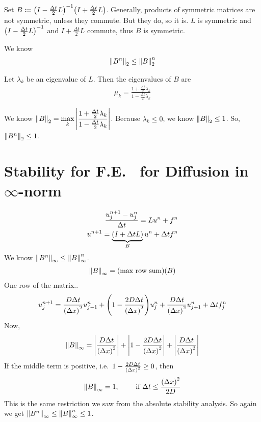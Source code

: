 \documentclass{article}
\newcommand{\Dx}{\Delta x}
\newcommand{\Dt}{\Delta t}
\newcommand{\centdiff}{\frac{u_j^{n+1} - u_j^n}{\Dt}}
\begin{document}
        Set $B \coloneqq \qty(I - \frac{\Dt}{2}L)^{-1}\qty(I + \frac{\Dt}{2}L)$.  Generally, products of symmetric matrices are not symmetric, unless they commute.  But they do, so it is.  $L$ is symmetric and $\qty(I - \frac{\Dt}{2}L)^{-1}$ and $I + \frac{\Dt}{2}L$ commute, thus $B$ is symmetric.

        We know
        \begin{align*}
            \norm{B^n}_2 \leq \norm{B}_2^n
        \end{align*}

        Let $\lambda_k$ be an eigenvalue of $L$.  Then the eigenvalues of $B$ are
        \begin{align*}
            \mu_k = \frac{1 + \frac{\Dt}{2}\lambda_k}{1 - \frac{\Dt}{2}\lambda_k}
        \end{align*}

        We know $\displaystyle\norm{B}_2 = \max_k\abs{\frac{1 + \frac{\Dt}{2}\lambda_k}{1 - \frac{\Dt}{2}\lambda_k}}$.  Because $\lambda_k \leq 0$, we know $\norm{B}_2 \leq 1$.  So, $\norm{B^n}_2 \leq 1$.

    \section{Stability for F.E.~ for Diffusion in $\infty$-norm}
        \begin{align*}
            \centdiff = Lu^n + f^n \\
            u^{n+1} = \underbrace{\qty(I + \Dt L)}_Bu^n + \Dt f^n
        \end{align*}
        We know $\norm{B^n}_\infty \leq \norm{B}^n_\infty$.
        \begin{align*}
            \norm{B}_\infty = (\text{max row sum})(B)
        \end{align*}
        One row of the matrix..
        \begin{align*}
            u_j^{n+1} = \frac{D\Dt}{\qty(\Dx)^2}u_{j-1}^n + \qty(1 - \frac{2D\Dt}{\qty(\Dx)^2})u_j^n + \frac{D\Dt}{\qty(\Dx)^2}u_{j+1}^n + \Dt f_j^n
        \end{align*}
        Now,
        \begin{align*}
            \norm{B}_\infty = \abs{\frac{D\Dt}{\qty(\Dx)^2}} + \abs{1 - \frac{2D\Dt}{\qty(\Dx)^2}} + \abs{\frac{D\Dt}{\qty(\Dx)^2}}
        \end{align*}\tabularnewline
        If the middle term is positive, i.e.~$1 - \frac{2D\Dt}{\qty(\Dx)^2} \geq 0$, then
        \begin{align*}
            \norm{B}_\infty = 1, \qquad \text{ if } \Dt \leq \frac{\qty(\Dx)^2}{2D}
        \end{align*}
        This is the same restriction we saw from the absolute stability analysis.  So again we get $\norm{B^n}_\infty \leq \norm{B}_\infty^n \leq 1$.
\end{document}
